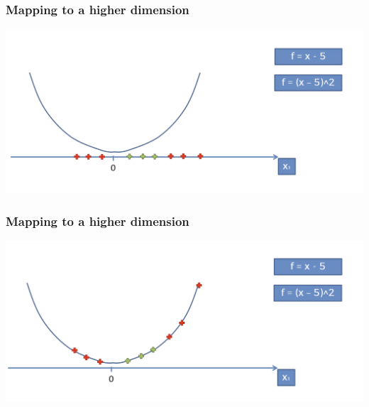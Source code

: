 \documentclass[compress, aspectratio=54]{beamer}
\begin{document}



\begin{frame}
\frametitle{Mapping to a higher dimension}
\includegraphics[width=0.85\linewidth ]{Figures/svm-f3.png}


\end{frame}

 
\begin{frame}
\frametitle{Mapping to a higher dimension}
\includegraphics[width=0.85\linewidth ]{Figures/svm-f4.png}


\end{frame}
\end{document}
